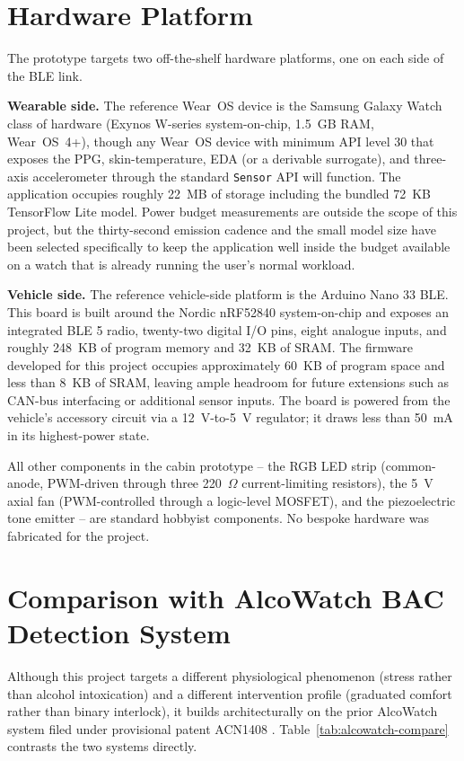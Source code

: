 \section{Hardware Platform}
\label{sec:arch-hw}

The prototype targets two off-the-shelf hardware platforms, one
on each side of the BLE link.

\textbf{Wearable side.} The reference Wear~OS device is the Samsung
Galaxy Watch class of hardware (Exynos W-series system-on-chip,
1.5~GB RAM, Wear~OS~4+), though any Wear~OS device with minimum
API level 30 that exposes the PPG, skin-temperature, EDA (or a
derivable surrogate), and three-axis accelerometer through the
standard \texttt{Sensor} API will function. The application occupies
roughly 22~MB of storage including the bundled 72~KB TensorFlow Lite
model. Power budget measurements are outside the scope of this
project, but the thirty-second emission cadence and the small model
size have been selected specifically to keep the application well
inside the budget available on a watch that is already running the
user's normal workload.

\textbf{Vehicle side.} The reference vehicle-side platform is the
Arduino Nano 33 BLE. This board is built around the Nordic nRF52840
system-on-chip and exposes an integrated BLE 5 radio, twenty-two
digital I/O pins, eight analogue inputs, and roughly 248~KB of
program memory and 32~KB of SRAM. The firmware developed for this
project occupies approximately 60~KB of program space and less than
8~KB of SRAM, leaving ample headroom for future extensions such as
CAN-bus interfacing or additional sensor inputs. The board is
powered from the vehicle's accessory circuit via a 12~V-to-5~V
regulator; it draws less than 50~mA in its highest-power state.

All other components in the cabin prototype -- the RGB LED strip
(common-anode, PWM-driven through three 220~$\Omega$ current-limiting
resistors), the 5~V axial fan (PWM-controlled through a logic-level
MOSFET), and the piezoelectric tone emitter -- are standard hobbyist
components. No bespoke hardware was fabricated for the project.

\section{Comparison with AlcoWatch BAC Detection System}
\label{sec:arch-compare}

Although this project targets a different physiological phenomenon
(stress rather than alcohol intoxication) and a different intervention
profile (graduated comfort rather than binary interlock), it builds
architecturally on the prior AlcoWatch system filed under provisional
patent ACN1408 \citep{acn1408}. Table~\ref{tab:alcowatch-compare}
contrasts the two systems directly.

